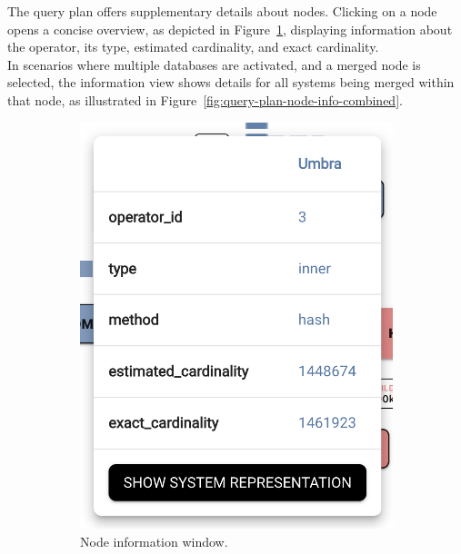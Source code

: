 
The query plan offers supplementary details about nodes. Clicking on a node opens a concise overview, as depicted in Figure~\ref{fig:query-plan-node-info-a}, displaying information about the operator, its type, estimated cardinality, and exact cardinality.\\
In scenarios where multiple databases are activated, and a merged node is selected, the information view shows details for all systems being merged within that node, as illustrated in Figure~\ref{fig:query-plan-node-info-combined}.

\begin{figure}[h]
  \centering
  \begin{subfigure}[b]{0.4\linewidth}
    \includegraphics[width=0.7\linewidth]{figures/query-plan-node-info.png}
    \caption{Node information window.}
      \label{fig:query-plan-node-info-a}
  \end{subfigure}
  \hspace{1cm} %
  \begin{subfigure}[b]{0.4\linewidth}

\end{subfigure}
\end{figure}
